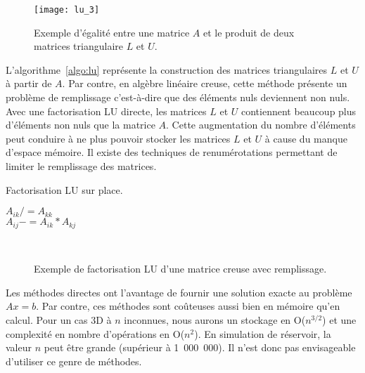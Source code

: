 \begin{figure}[!h]
  \centering
  \texttt{[image: lu\_3]}
  \caption{Exemple d'égalité entre une matrice $A$ et le produit de deux matrices triangulaire $L$ et $U$.}
  \label{fig:lu_3}
\end{figure}


L'algorithme~\ref{algo:lu} représente la construction des matrices triangulaires $L$ et $U$ à partir de $A$.
%
Par contre, en algèbre linéaire creuse, cette méthode présente un problème de remplissage c'est-à-dire que des éléments nuls deviennent non nuls.
%
Avec une factorisation LU directe, les matrices $L$ et $U$ contiennent beaucoup plus d'éléments non nuls que la matrice $A$.
%
Cette augmentation du nombre d'éléments peut conduire à ne plus pouvoir stocker les matrices $L$ et $U$ à cause du manque d'espace mémoire.
%
Il existe des techniques de renumérotations permettant de limiter le remplissage des matrices\cite{ordering_scotch,ordering_metis}.

\begin{algorithm}
  \caption{Factorisation LU sur place.}
  \label{algo:lu}
   {
     {
      $A_{ik} /= A_{kk}$ \\
       {
        $A_{ij} -= A_{ik}*A_{kj}$
      }
    }
  }
\end{algorithm}

\begin{figure}[!h]
     \begin{center}
        ~
    \end{center}
    \caption{Exemple de factorisation LU d'une matrice creuse avec remplissage.}
    \label{fig:lu_example}
\end{figure}

Les méthodes directes ont l'avantage de fournir une solution exacte au problème $Ax=b$.
%
Par contre, ces méthodes sont coûteuses aussi bien en mémoire qu'en calcul.
%
Pour un cas 3D à $n$ inconnues, nous aurons un stockage en O($n^{3/2}$) et une complexité en nombre d'opérations en O($n^2$).
%
En simulation de réservoir, la valeur $n$ peut être grande (supérieur à 1~000~000).
%
Il n'est donc pas envisageable d'utiliser ce genre de méthodes.
